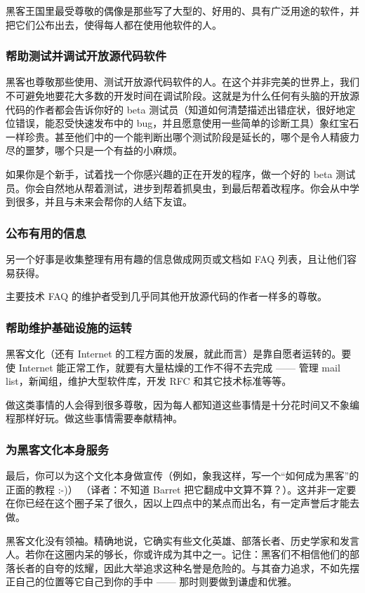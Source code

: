 黑客王国里最受尊敬的偶像是那些写了大型的、好用的、具有广泛用途的软件，并把它们公布出去，使得每人都在使用他软件的人。


\subsubsection{帮助测试并调试开放源代码软件}
黑客也尊敬那些使用、测试开放源代码软件的人。在这个并非完美的世界上，我们不可避免地要花大多数的开发时间在调试阶段。这就是为什么任何有头脑的开放源代码的作者都会告诉你好的 beta 测试员（知道如何清楚描述出错症状，很好地定位错误，能忍受快速发布中的 bug，并且愿意使用一些简单的诊断工具）象红宝石一样珍贵。甚至他们中的一个能判断出哪个测试阶段是延长的，哪个是令人精疲力尽的噩梦，哪个只是一个有益的小麻烦。

如果你是个新手，试着找一个你感兴趣的正在开发的程序，做一个好的 beta 测试员。你会自然地从帮着测试，进步到帮着抓臭虫，到最后帮着改程序。你会从中学到很多，并且与未来会帮你的人结下友谊。


\subsubsection{公布有用的信息}
另一个好事是收集整理有用有趣的信息做成网页或文档如 FAQ 列表，且让他们容易获得。

主要技术 FAQ 的维护者受到几乎同其他开放源代码的作者一样多的尊敬。


\subsubsection{帮助维护基础设施的运转}
黑客文化（还有 Internet 的工程方面的发展，就此而言）是靠自愿者运转的。要使 Internet 能正常工作，就要有大量枯燥的工作不得不去完成 —— 管理 mail list，新闻组，维护大型软件库，开发 RFC 和其它技术标准等等。

做这类事情的人会得到很多尊敬，因为每人都知道这些事情是十分花时间又不象编程那样好玩。做这些事情需要奉献精神。


\subsubsection{为黑客文化本身服务}
最后，你可以为这个文化本身做宣传（例如，象我这样，写一个“如何成为黑客”的正面的教程 :-)） （译者：不知道 Barret 把它翻成中文算不算？）。这并非一定要在你已经在这个圈子呆了很久，因以上四点中的某点而出名，有一定声誉后才能去做。

黑客文化没有领袖。精确地说，它确实有些文化英雄、部落长者、历史学家和发言人。若你在这圈内呆的够长，你或许成为其中之一。记住：黑客们不相信他们的部落长者的自夸的炫耀，因此大举追求这种名誉是危险的。与其奋力追求，不如先摆正自己的位置等它自己到你的手中 —— 那时则要做到谦虚和优雅。


